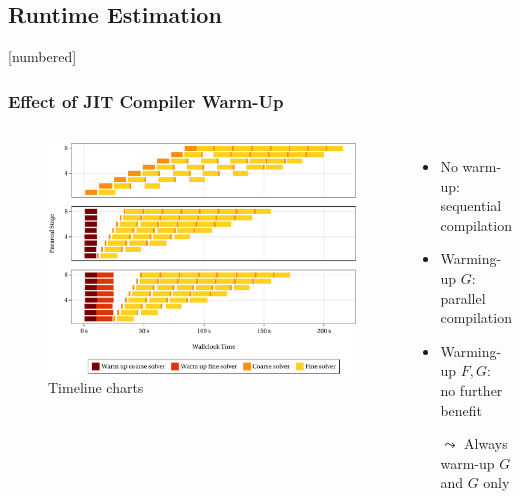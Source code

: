 \subsection{Runtime Estimation}
\begin{frame}[fragile]
  [numbered]
  \frametitle{Effect of JIT Compiler Warm-Up}
  \begin{columns}
    \begin{figure}
    \includegraphics[width=\textwidth]{figures/fig_impl_warmup1.pdf}%
    \renewcommand\thefigure{7.1} %
    \caption{Timeline charts}
    \end{figure}
    \begin{itemize}
      \item
        No warm-up:\\ sequential compilation
        \vspace{2.4em}
      \item
        Warming-up $G$:\\ parallel compilation
        \vspace{2.4em}
      \item
        Warming-up $F,G$:\\ no further benefit
        \vspace{2.4em}
      \pause
      \item[$\leadsto$]
        Always warm-up $G$\\ and $G$ only
    \end{itemize}
    \vspace{2em}
  \end{columns}
\end{frame}

